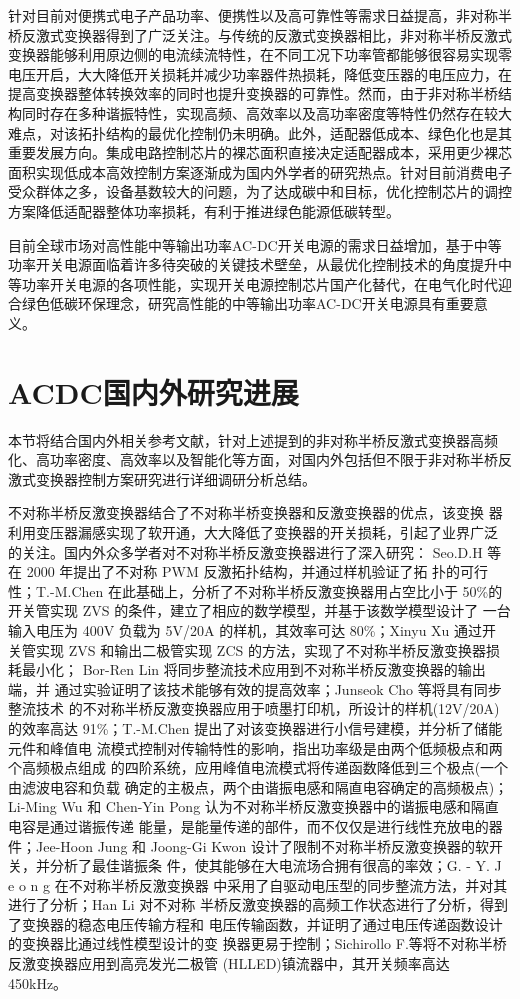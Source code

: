 针对目前对便携式电子产品功率、便携性以及高可靠性等需求日益提高，非对称半桥反激式变换器得到了广泛关注。与传统的反激式变换器相比，非对称半桥反激式变换器能够利用原边侧的电流续流特性，在不同工况下功率管都能够很容易实现零电压开启，大大降低开关损耗并减少功率器件热损耗，降低变压器的电压应力，在提高变换器整体转换效率的同时也提升变换器的可靠性。然而，由于非对称半桥结构同时存在多种谐振特性，实现高频、高效率以及高功率密度等特性仍然存在较大难点，对该拓扑结构的最优化控制仍未明确。此外，适配器低成本、绿色化也是其重要发展方向。集成电路控制芯片的裸芯面积直接决定适配器成本，采用更少裸芯面积实现低成本高效控制方案逐渐成为国内外学者的研究热点。针对目前消费电子受众群体之多，设备基数较大的问题，为了达成碳中和目标，优化控制芯片的调控方案降低适配器整体功率损耗，有利于推进绿色能源低碳转型。

目前全球市场对高性能中等输出功率AC-DC开关电源的需求日益增加，基于中等功率开关电源面临着许多待突破的关键技术壁垒，从最优化控制技术的角度提升中等功率开关电源的各项性能，实现开关电源控制芯片国产化替代，在电气化时代迎合绿色低碳环保理念，研究高性能的中等输出功率AC-DC开关电源具有重要意义。



\section{ACDC国内外研究进展}

本节将结合国内外相关参考文献，针对上述提到的非对称半桥反激式变换器高频化、高功率密度、高效率以及智能化等方面，对国内外包括但不限于非对称半桥反激式变换器控制方案研究进行详细调研分析总结。

不对称半桥反激变换器结合了不对称半桥变换器和反激变换器的优点，该变换 器利用变压器漏感实现了软开通，大大降低了变换器的开关损耗，引起了业界广泛 的关注。国内外众多学者对不对称半桥反激变换器进行了深入研究： Seo.D.H 等在 2000 年提出了不对称 PWM 反激拓扑结构，并通过样机验证了拓 扑的可行性；T.-M.Chen 在此基础上，分析了不对称半桥反激变换器用占空比小于 50\%的开关管实现 ZVS 的条件，建立了相应的数学模型，并基于该数学模型设计了 一台输入电压为 400V 负载为 5V/20A 的样机，其效率可达 80\%；Xinyu Xu 通过开 关管实现 ZVS 和输出二极管实现 ZCS 的方法，实现了不对称半桥反激变换器损耗最小化； Bor-Ren Lin 将同步整流技术应用到不对称半桥反激变换器的输出端，并 通过实验证明了该技术能够有效的提高效率；Junseok Cho 等将具有同步整流技术 的不对称半桥反激变换器应用于喷墨打印机，所设计的样机(12V/20A)的效率高达 91\%；T.-M.Chen 提出了对该变换器进行小信号建模，并分析了储能元件和峰值电 流模式控制对传输特性的影响，指出功率级是由两个低频极点和两个高频极点组成 的四阶系统，应用峰值电流模式将传递函数降低到三个极点(一个由滤波电容和负载 确定的主极点，两个由谐振电感和隔直电容确定的高频极点)；Li-Ming Wu 和 Chen-Yin Pong 认为不对称半桥反激变换器中的谐振电感和隔直电容是通过谐振传递 能量，是能量传递的部件，而不仅仅是进行线性充放电的器件；Jee-Hoon Jung 和 Joong-Gi Kwon 设计了限制不对称半桥反激变换器的软开关，并分析了最佳谐振条 件，使其能够在大电流场合拥有很高的率效；G. - Y. J e o n g 在不对称半桥反激变换器 中采用了自驱动电压型的同步整流方法，并对其进行了分析；Han Li 对不对称 半桥反激变换器的高频工作状态进行了分析，得到了变换器的稳态电压传输方程和 电压传输函数，并证明了通过电压传递函数设计的变换器比通过线性模型设计的变 换器更易于控制；Sichirollo F.等将不对称半桥反激变换器应用到高亮发光二极管 (HLLED)镇流器中，其开关频率高达 450kHz。


